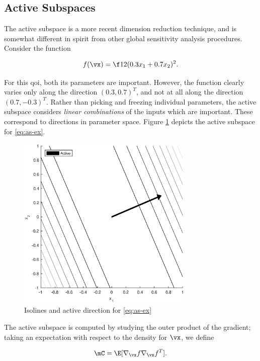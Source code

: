\documentclass[../primer.tex]{subfiles}
\begin{document}
\subsection{Active Subspaces}
\label{sec:org7724f8f}
The active subspace is a more recent dimension reduction technique, and is
somewhat different in spirit from other global sensitivity analysis
procedures.\cite{constantine2015} Consider the function

\begin{equation}\label{eq:as-ex}
  f(\vx) = \f12(0.3x_1+0.7x_2)^2.
\end{equation}

\noindent For this qoi, both its parameters are important. However, the function
clearly varies only along the direction \((0.3,0.7)^T\), and not at all along the
direction \((0.7,-0.3)^T\). Rather than picking and freezing individual
parameters, the active subspace considers \emph{linear combinations} of the inputs
which are important. These correspond to directions in parameter space. Figure
\ref{fig:as-ex} depicts the active subspace for \eqref{eq:as-ex}.

\begin{figure}[!ht]
  \centering
  \includegraphics[width=0.75\textwidth]{./images/contour_plot}
  \caption{Isolines and active direction for \eqref{eq:as-ex}}
  \label{fig:as-ex}
\end{figure}

The active subspace is computed by studying the outer product of the gradient;
taking an expectation with respect to the density for \(\vx\), we define

\begin{equation}\label{eq:as-c}
  \mC = \E[\nabla_{\vx}f\nabla_{\vx}f^T].
\end{equation}
\end{document}

